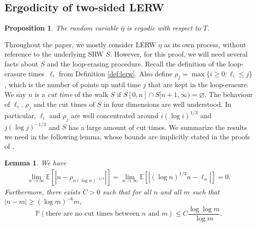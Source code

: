 \documentclass{article}
\renewcommand{\P}{\mathbb{P}}
\newcommand{\E}{\mathbb{E}}
\newcommand{\1}{\mathbf{1}}
\newcommand{\limn}{\lim_{n\rightarrow\infty}}
\renewcommand{\l}{\ell}
\newcommand{\heta}{\hat\eta}
\newtheorem{lemma}[theorem]{Lemma}
\newtheorem{proposition}[theorem]{Proposition}
\theoremstyle{definition}
\numberwithin{equation}{section}
\numberwithin{theorem}{section}
\begin{document}
\subsection{Ergodicity of two-sided LERW}\label{sec:twosided4}
\begin{proposition}\label{prop:ergodicity4}
The random variable $\heta$ is ergodic with respect to $T$. 
\end{proposition}
Throughout the paper, we mostly consider LERW $\eta$ as its own process, without reference to the underlying SRW $S$. However, for this proof, we will need several facts about $S$ and the loop-erasing procedure. Recall the definition of the loop-erasure times~$\l_i$ from Definition \ref{def:lerw}. Also define $\rho_j=\max\{i\geq 0\colon\l_i\leq j\}$, which is the number of points up until time $j$ that are kept in the loop-erasure. We say $n$ is a \emph{cut time} of the walk $S$ if $S[0,n]\cap S[n+1,\infty)=\varnothing$. The behaviour of $\l_i$, $\rho_j$ and the cut times of $S$ in four dimensions are well understood. In particular, $\l_i$ and $\rho_j$ are well concentrated around $i(\log i)^{1/3}$ and $j(\log j)^{-1/3}$ and $S$ has a large amount of cut times. We summarize the results we need in the following lemma, whose bounds are implicitly stated in the proofs of \cite[Lemma~7.7.4 and Theorem 7.7.5]{lawler91intersections}.
\begin{lemma}\label{lemma:cuttimes}
We have
\begin{equation}
	\begin{split}
		\limn\E\left[|n-\rho_{n(\log n)^{-1/3}}|\right]=\limn\E\left[|(\log n)^{1/3}n-\l_n|\right]=0.
	\end{split}
\end{equation}
Furthermore, there exists $C>0$ such that for all $n$ and all $m$ such that $|n-m|\geq (\log m)^{-6}m$,
\begin{equation}
	\P(\text{there are no cut times between $n$ and $m$})\leq C\frac{\log\log m}{\log m}.
\end{equation}
\end{lemma}
\end{document}
